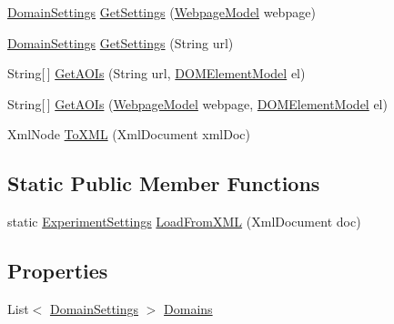 \begin{DoxyCompactItemize}
\item 
\hyperlink{class_web_analyzer_1_1_models_1_1_settings_model_1_1_domain_settings}{Domain\+Settings} \hyperlink{class_web_analyzer_1_1_models_1_1_settings_model_1_1_experiment_settings_a8c574eb50eb580ad4bc990456215e6d0}{Get\+Settings} (\hyperlink{class_web_analyzer_1_1_models_1_1_data_model_1_1_webpage_model}{Webpage\+Model} webpage)
\item 
\hyperlink{class_web_analyzer_1_1_models_1_1_settings_model_1_1_domain_settings}{Domain\+Settings} \hyperlink{class_web_analyzer_1_1_models_1_1_settings_model_1_1_experiment_settings_a26caccee1fb4f572addc15c90e07feb4}{Get\+Settings} (String url)
\item 
String\mbox{[}$\,$\mbox{]} \hyperlink{class_web_analyzer_1_1_models_1_1_settings_model_1_1_experiment_settings_a2fdbe523bf5bc6cd721d10090f1d01b2}{Get\+A\+O\+Is} (String url, \hyperlink{class_web_analyzer_1_1_models_1_1_data_model_1_1_d_o_m_element_model}{D\+O\+M\+Element\+Model} el)
\item 
String\mbox{[}$\,$\mbox{]} \hyperlink{class_web_analyzer_1_1_models_1_1_settings_model_1_1_experiment_settings_ab0b4dc8d742e0821d088adc78b980795}{Get\+A\+O\+Is} (\hyperlink{class_web_analyzer_1_1_models_1_1_data_model_1_1_webpage_model}{Webpage\+Model} webpage, \hyperlink{class_web_analyzer_1_1_models_1_1_data_model_1_1_d_o_m_element_model}{D\+O\+M\+Element\+Model} el)
\item 
Xml\+Node \hyperlink{class_web_analyzer_1_1_models_1_1_settings_model_1_1_experiment_settings_a3607aab81aaf98bd53880595cf2d1c78}{To\+X\+M\+L} (Xml\+Document xml\+Doc)
\end{DoxyCompactItemize}
\subsection*{Static Public Member Functions}
\begin{DoxyCompactItemize}
\item 
static \hyperlink{class_web_analyzer_1_1_models_1_1_settings_model_1_1_experiment_settings}{Experiment\+Settings} \hyperlink{class_web_analyzer_1_1_models_1_1_settings_model_1_1_experiment_settings_abed3a5d3b5034e8f8f466082645abedf}{Load\+From\+X\+M\+L} (Xml\+Document doc)
\end{DoxyCompactItemize}
\subsection*{Properties}
\begin{DoxyCompactItemize}
\item 
List$<$ \hyperlink{class_web_analyzer_1_1_models_1_1_settings_model_1_1_domain_settings}{Domain\+Settings} $>$ \hyperlink{class_web_analyzer_1_1_models_1_1_settings_model_1_1_experiment_settings_a3eb9dd2816871834368fe4dfd5a1b52e}{Domains}
\end{DoxyCompactItemize}
